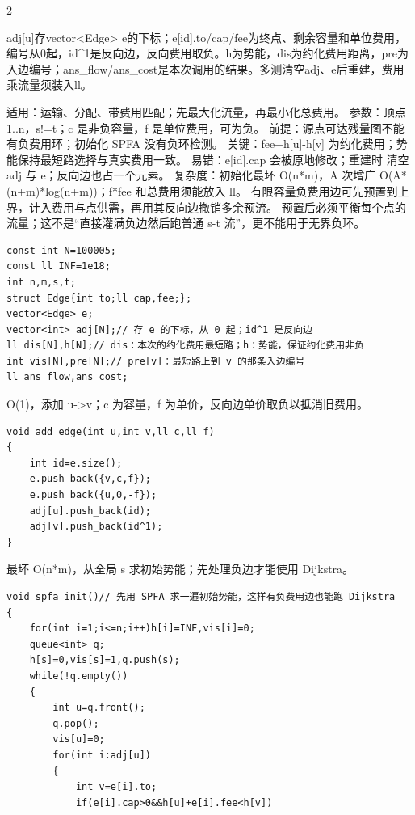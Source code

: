 \documentclass[UTF8,fontset=fandol,a4paper,twoside]{ctexart}
\newcommand{\note}[1]{{\fontsize{10}{12}\selectfont #1\par}}
\begin{document}
\begin{multicols}{2}
\note{adj[\allowbreak{}u]\allowbreak{}存vector<\allowbreak{}Edge>\allowbreak{} e的下标；e[\allowbreak{}id]\allowbreak{}.\allowbreak{}to/\allowbreak{}cap/\allowbreak{}fee为终点、剩余容量和单位费用，编号从0起，id\textasciicircum{}1是反向边，反向费用取负。h为势能，dis为约化费用距离，pre为入边编号；ans\_flow/\allowbreak{}ans\_cost是本次调用的结果。多测清空adj、e后重建，费用乘流量须装入ll。}
\note{适用：运输、分配、带费用匹配；先最大化流量，再最小化总费用。 参数：顶点 1.\allowbreak{}.\allowbreak{}n，s!=\allowbreak{}t；c 是非负容量，f 是单位费用，可为负。 前提：源点可达残量图不能有负费用环；初始化 SPFA 没有负环检测。 关键：fee+\allowbreak{}h[\allowbreak{}u]\allowbreak{}-\allowbreak{}h[\allowbreak{}v]\allowbreak{} 为约化费用；势能保持最短路选择与真实费用一致。 易错：e[\allowbreak{}id]\allowbreak{}.\allowbreak{}cap 会被原地修改；重建时 清空 adj 与 e；反向边也占一个元素。 复杂度：初始化最坏 O(\allowbreak{}n*m)\allowbreak{}，A 次增广 O(\allowbreak{}A*(\allowbreak{}n+\allowbreak{}m)\allowbreak{}*log(\allowbreak{}n+\allowbreak{}m)\allowbreak{})\allowbreak{}；f*fee 和总费用须能放入 ll。 有限容量负费用边可先预置到上界，计入费用与点供需，再用其反向边撤销多余预流。 预置后必须平衡每个点的流量；这不是“直接灌满负边然后跑普通 s-\allowbreak{}t 流”，更不能用于无界负环。}
\begin{lstlisting}
const int N=100005;
const ll INF=1e18;
int n,m,s,t;
struct Edge{int to;ll cap,fee;};
vector<Edge> e;
vector<int> adj[N];// 存 e 的下标，从 0 起；id^1 是反向边
ll dis[N],h[N];// dis：本次的约化费用最短路；h：势能，保证约化费用非负
int vis[N],pre[N];// pre[v]：最短路上到 v 的那条入边编号
ll ans_flow,ans_cost;
\end{lstlisting}
\note{O(\allowbreak{}1)\allowbreak{}，添加 u-\allowbreak{}>\allowbreak{}v；c 为容量，f 为单价，反向边单价取负以抵消旧费用。}
\begin{lstlisting}
void add_edge(int u,int v,ll c,ll f)
{
    int id=e.size();
    e.push_back({v,c,f});
    e.push_back({u,0,-f});
    adj[u].push_back(id);
    adj[v].push_back(id^1);
}
\end{lstlisting}
\note{最坏 O(\allowbreak{}n*m)\allowbreak{}，从全局 s 求初始势能；先处理负边才能使用 Dijkstra。}
\begin{lstlisting}
void spfa_init()// 先用 SPFA 求一遍初始势能，这样有负费用边也能跑 Dijkstra
{
    for(int i=1;i<=n;i++)h[i]=INF,vis[i]=0;
    queue<int> q;
    h[s]=0,vis[s]=1,q.push(s);
    while(!q.empty())
    {
        int u=q.front();
        q.pop();
        vis[u]=0;
        for(int i:adj[u])
        {
            int v=e[i].to;
            if(e[i].cap>0&&h[u]+e[i].fee<h[v])

\end{lstlisting}
\end{multicols}
\end{document}

